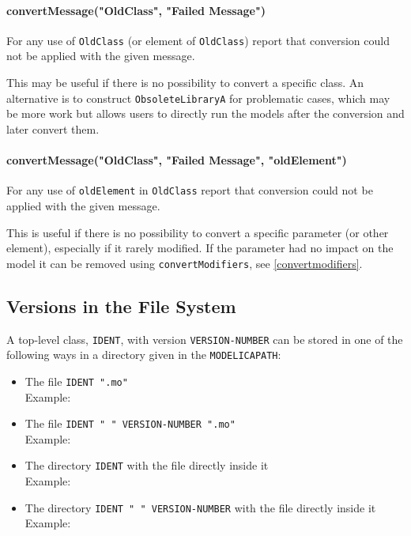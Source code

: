 \paragraph*{convertMessage("OldClass", "Failed Message")}\label{convertmessageoldclass-failed-message}

For any use of \lstinline!OldClass! (or element of \lstinline!OldClass!) report that conversion
could not be applied with the given message.

\begin{nonnormative}
This may be useful if there is no possibility to convert a specific class. An alternative is to construct \lstinline!ObsoleteLibraryA! for problematic
cases, which may be more work but allows users to directly run the models after the conversion and later convert them.
\end{nonnormative}

\paragraph*{convertMessage("OldClass", "Failed Message", "oldElement")}\label{convertmessageoldclass-failed-message2}

For any use of \lstinline!oldElement! in \lstinline!OldClass! report that conversion
could not be applied with the given message.

\begin{nonnormative}
This is useful if there is no possibility to convert a specific parameter (or other element), especially if it rarely modified.  If the parameter had no impact on the model it can be removed using \lstinline!convertModifiers!, see \cref{convertmodifiers}.
\end{nonnormative}

\subsection{Versions in the File System}\label{mapping-of-versions-to-file-system}\label{versions-in-the-File-System}

A top-level class, \lstinline!IDENT!, with version \lstinline!VERSION-NUMBER! can be stored in
one of the following ways in a directory given in the \lstinline!MODELICAPATH!:
\begin{itemize}
\item
  The file \lstinline!IDENT ".mo"!\\
  Example: 
\item
  The file \lstinline!IDENT " " VERSION-NUMBER ".mo"!\\
  Example: 
\item
  The directory \lstinline!IDENT! with the file  directly inside it\\
  Example: 
\item
  The directory \lstinline!IDENT " " VERSION-NUMBER! with the file  directly inside it\\
  Example: 
\end{itemize}

